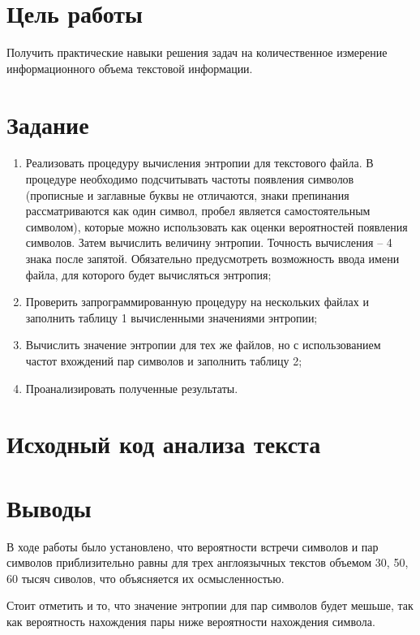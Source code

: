 \documentclass[listings]{labreport}
\begin{document}
\maketitlepage

\section*{Цель работы}

Получить практические навыки решения задач на количественное измерение
информационного объема текстовой информации.

\section*{Задание}

\begin{enumerate}
\item Реализовать процедуру вычисления энтропии для текстового файла. В процедуре
необходимо подсчитывать частоты появления символов (прописные и заглавные буквы
не отличаются, знаки препинания рассматриваются как один символ, пробел является
самостоятельным символом), которые можно использовать как оценки вероятностей
появления символов. Затем вычислить величину энтропии. Точность вычисления --
4 знака после запятой. Обязательно предусмотреть возможность ввода имени файла,
для которого будет вычисляться энтропия;
\item Проверить запрограммированную процедуру на нескольких файлах
и заполнить таблицу 1 вычисленными значениями энтропии;
\item Вычислить значение энтропии для тех же файлов, но с использованием
частот вхождений пар символов и заполнить таблицу 2;
\item Проанализировать полученные результаты.
\end{enumerate}

\section*{Исходный код анализа текста}



\section*{Выводы}

В ходе работы было установлено, что вероятности встречи символов и пар символов
приблизительно равны для трех англоязычных текстов объемом 30, 50, 60 тысяч сиволов,
что объясняется их осмысленностью.

Стоит отметить и то, что значение энтропии для пар символов будет мешьше, 
так как вероятность нахождения пары ниже вероятности нахождения символа.
\end{document}
